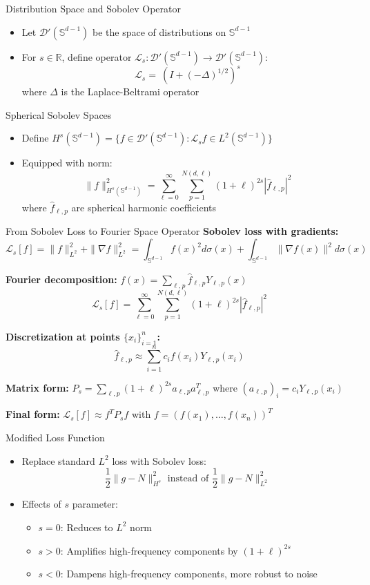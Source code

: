 \documentclass{beamer}
\newcommand{\R}{\mathbb{R}}
\newcommand{\Sd}{\mathbb{S}^{d-1}}
\newcommand{\Lap}{\Delta}
\newcommand{\Ls}{\mathcal{L}_s}
\begin{document}
\begin{frame}{Distribution Space and Sobolev Operator}
\begin{itemize}
\item Let $\mathcal{D}'(\Sd)$ be the space of distributions on $\Sd$
\item For $s \in \R$, define operator $\Ls: \mathcal{D}'(\Sd) \to \mathcal{D}'(\Sd)$:
\[ \Ls = \ (I + (-\Lap)^{1/2})^s \]
where $\Lap$ is the Laplace-Beltrami operator
\end{itemize}
\end{frame}

\begin{frame}{Spherical Sobolev Spaces}
\begin{itemize}
\item Define $H^s(\Sd) = \{f \in \mathcal{D}'(\Sd) : \Ls f \in L^2(\Sd)\}$
\item Equipped with norm:
\[ \|f\|^2_{H^s(\Sd)} = \sum_{\ell=0}^{\infty} \sum_{p=1}^{N(d,\ell)} (1+\ell)^{2s} |\hat{f}_{\ell,p}|^2 \]
where $\hat{f}_{\ell,p}$ are spherical harmonic coefficients
\end{itemize}
\end{frame}



\begin{frame}{From Sobolev Loss to Fourier Space Operator}
\textbf{Sobolev loss with gradients:}
\[ \mathcal{L}_s[f] = \|f\|_{L^2}^2 + \|\nabla f\|_{L^2}^2 = \int_{\Sd} f(x)^2 d\sigma(x) + \int_{\Sd} \|\nabla f(x)\|^2 d\sigma(x) \]

\textbf{Fourier decomposition:} $f(x) = \sum_{\ell,p} \hat{f}_{\ell,p} Y_{\ell,p}(x)$
\[ \mathcal{L}_s[f] = \sum_{\ell=0}^{\infty} \sum_{p=1}^{N(d,\ell)} (1+\ell)^{2s} |\hat{f}_{\ell,p}|^2 \]

\textbf{Discretization at points $\{x_i\}_{i=1}^n$:}
\[ \hat{f}_{\ell,p} \approx \sum_{i=1}^n c_i f(x_i) Y_{\ell,p}(x_i) \]

\textbf{Matrix form:} $P_s = \sum_{\ell,p} (1+\ell)^{2s} a_{\ell,p} a_{\ell,p}^T$
where $(a_{\ell,p})_i = c_i Y_{\ell,p}(x_i)$

\textbf{Final form:} $\mathcal{L}_s[f] \approx f^T P_s f$ with $f = (f(x_1), \ldots, f(x_n))^T$
\end{frame}



\begin{frame}{Modified Loss Function}
\begin{itemize}
\item Replace standard $L^2$ loss with Sobolev loss:
\[ \frac{1}{2}\|g-N\|^2_{H^s} \text{ instead of } \frac{1}{2}\|g-N\|^2_{L^2} \]
\item Effects of $s$ parameter:
\begin{itemize}
\item $s = 0$: Reduces to $L^2$ norm
\item $s > 0$: Amplifies high-frequency components by $(1+\ell)^{2s}$
\item $s < 0$: Dampens high-frequency components, more robust to noise
\end{itemize}
\end{itemize}
\end{frame}
\end{document}
